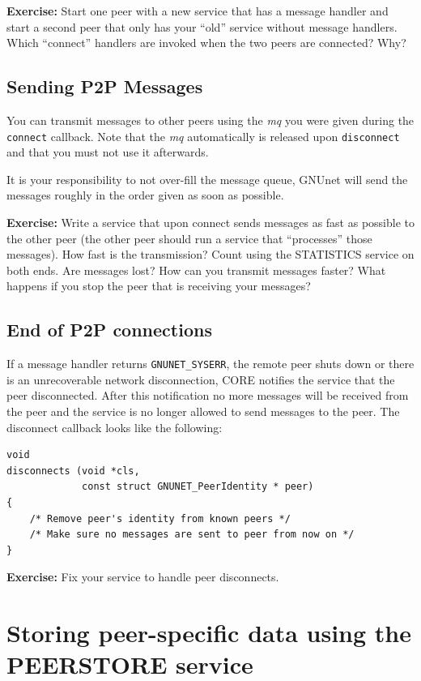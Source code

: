 \documentclass[10pt]{article}
\newcommand{\exercise}[1]{\noindent\begin{boxedminipage}{\textwidth}{\bf Exercise:} #1 \end{boxedminipage}}
\begin{document}
\exercise{Start one peer with a new service that has a message
handler and start a second peer that only has your ``old'' service
without message handlers.  Which ``connect'' handlers are invoked when
the two peers are connected?  Why?}


\subsection{Sending P2P Messages}

You can transmit messages to other peers using the {\it mq} you were
given during the {\tt connect} callback.  Note that the {\it mq}
automatically is released upon {\tt disconnect} and that you must
not use it afterwards.

It is your responsibility to not over-fill the message queue, GNUnet
will send the messages roughly in the order given as soon as possible.

\exercise{Write a service that upon connect sends messages as
fast as possible to the other peer (the other peer should run a
service that ``processes'' those messages).  How fast is the
transmission?  Count using the STATISTICS service on both ends.  Are
messages lost? How can you transmit messages faster?  What happens if
you stop the peer that is receiving your messages?}


\subsection{End of P2P connections}

If a message handler returns {\tt GNUNET\_SYSERR}, the remote peer shuts down or
there is an unrecoverable network disconnection, CORE notifies the service that
the peer disconnected. After this notification no more messages will be received
from the peer and the service is no longer allowed to send messages to the peer.
The disconnect callback looks like the following:

\lstset{language=C}
\begin{lstlisting}
void
disconnects (void *cls,
             const struct GNUNET_PeerIdentity * peer)
{
    /* Remove peer's identity from known peers */
    /* Make sure no messages are sent to peer from now on */
}
\end{lstlisting}

\exercise{Fix your service to handle peer disconnects.}

\section{Storing peer-specific data using the PEERSTORE service}
\end{document}
